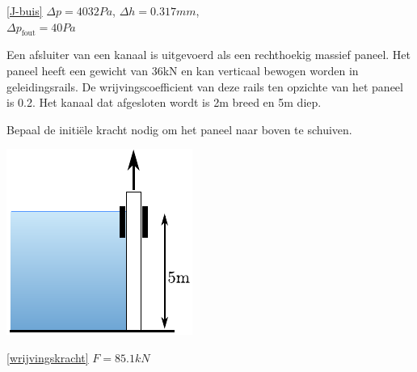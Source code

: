 \begin{antwoord}{\ref{J-buis}}
	$\Delta p = 4032\unit{Pa}$, $\Delta h = 0.317\unit{mm}$,\\ $\Delta p_{\text{fout}} = 40\unit{Pa}$
\end{antwoord}
\begin{toepassing}[*]
	\label{wrijvingskracht}
Een afsluiter van een kanaal is uitgevoerd als een rechthoekig massief paneel. Het paneel heeft een gewicht van 36kN en kan verticaal bewogen worden in geleidingsrails. De wrijvingscoefficient van deze rails ten opzichte van het paneel is 0.2. Het kanaal dat afgesloten wordt is 2m breed en 5m diep.
		
Bepaal de initiële kracht nodig om het paneel naar boven te schuiven.

	\centering
	\includegraphics{fig/hydrostatica/wrijvingskracht}
\end{toepassing}
\begin{antwoord}{\ref{wrijvingskracht}}
	$F = 85.1\unit{kN}$
\end{antwoord}
